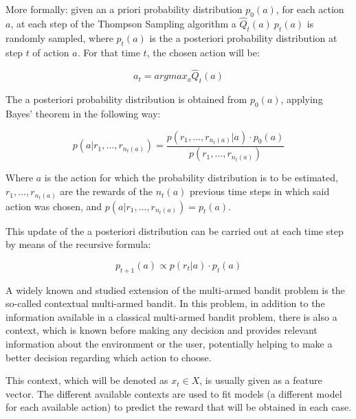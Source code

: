 \documentclass[../main.tex]{subfiles}
\begin{document}
More formally: given an a priori probability distribution $p_{0}\left(a\right)$, for 
each action $a$, at each step of the Thompson Sampling algorithm a 
$\hat{Q}_{t}\left(a\right) ~ p_{t}\left(a\right)$ is randomly sampled, where 
$p_{t}\left(a\right)$ is the a posteriori probability distribution at step $t$ of 
action $a$. For that time $t$, the chosen action will be:  

\begin{equation*}
    a_{t} = argmax_{a}\hat{Q}_{t}\left(a\right)
\end{equation*}

The a posteriori probability distribution is obtained from $p_{0}\left(a\right)$, 
applying Bayes’ theorem in the following way:  

\begin{equation*}
    p\left(a | r_{1}, ..., r_{n_{t}\left(a\right)}\right) = \dfrac{p\left(r_{1}, ..., r_{n_{t}\left(a\right)} | a\right) \cdot p_{0}\left(a\right)}{p\left(r_{1}, ..., r_{n_{t}\left(a\right)}\right)}
\end{equation*}

Where $a$ is the action for which the probability distribution is to be estimated, 
$r_{1}, ..., r_{n_{t}\left(a\right)}$ are the rewards of the $n_{t}\left(a\right)$ 
previous time steps in which said action was chosen, and 
$p\left(a | r_{1}, ..., r_{n_{t}\left(a\right)}\right) = p_{t}\left(a\right)$.  

This update of the a posteriori distribution can be carried out at each time step 
by means of the recursive formula:  

\begin{equation*}
    p_{t+1}\left(a\right) \propto p\left(r_{t} | a\right) \cdot p_{t}\left(a\right)
\end{equation*}

A widely known and studied extension of the multi-armed bandit problem is the 
so-called contextual multi-armed bandit. In this problem, in addition to the 
information available in a classical multi-armed bandit problem, there is also a context, 
which is known before making any decision and provides relevant information about the 
environment or the user, potentially helping to make a better decision regarding which 
action to choose.  

This context, which will be denoted as $x_{t} \in X$, is usually given as a feature vector. 
The different available contexts are used to fit models (a different model for each 
available action) to predict the reward that will be obtained in each case.  
\end{document}
